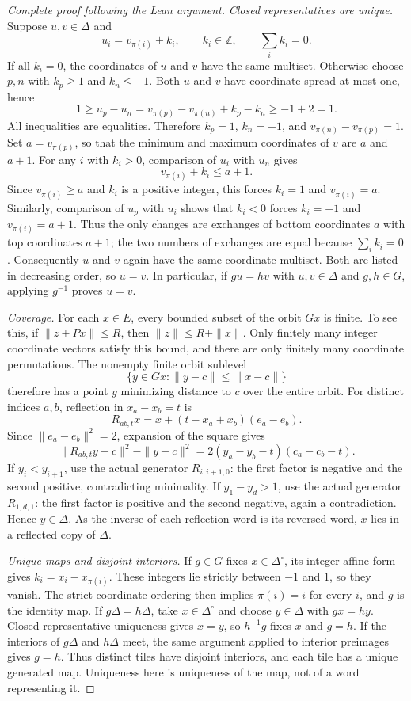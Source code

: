 \begin{proof}[Complete proof following the Lean argument]
\emph{Closed representatives are unique.}
Suppose \(u,v\in\Delta\) and
\[
             u_i=v_{\pi(i)}+k_i,\qquad
             k_i\in\mathbb Z,\qquad \sum_i k_i=0.
\]
If all \(k_i=0\), the coordinates of \(u\) and \(v\) have the same multiset.
Otherwise choose \(p,n\) with \(k_p\ge1\) and \(k_n\le-1\).
Both \(u\) and \(v\) have coordinate spread at most one, hence
\[
  1\ge u_p-u_n
     =v_{\pi(p)}-v_{\pi(n)}+k_p-k_n
     \ge-1+2=1.
\]
All inequalities are equalities. Therefore \(k_p=1\), \(k_n=-1\), and
\(v_{\pi(n)}-v_{\pi(p)}=1\). Set \(a=v_{\pi(p)}\), so that the minimum
and maximum coordinates of \(v\) are \(a\) and \(a+1\).
For any \(i\) with \(k_i>0\), comparison of \(u_i\) with \(u_n\) gives
\[
             v_{\pi(i)}+k_i\le a+1.
\]
Since \(v_{\pi(i)}\ge a\) and \(k_i\) is a positive integer, this forces
\(k_i=1\) and \(v_{\pi(i)}=a\).
Similarly, comparison of \(u_p\) with \(u_i\) shows that \(k_i<0\)
forces \(k_i=-1\) and \(v_{\pi(i)}=a+1\).
Thus the only changes are exchanges of bottom coordinates \(a\) with top
coordinates \(a+1\); the two numbers of exchanges are equal because
\(\sum_i k_i=0\). Consequently \(u\) and \(v\) again have the same
coordinate multiset. Both are listed in decreasing order, so \(u=v\).
In particular, if \(g u=h v\) with \(u,v\in\Delta\) and \(g,h\in G\),
applying \(g^{-1}\) proves \(u=v\).

\emph{Coverage.}
For each \(x\in E\), every bounded subset of the orbit \(Gx\) is finite.
To see this, if \(\|z+P x\|\le R\), then
\(\|z\|\le R+\|x\|\). Only finitely many integer coordinate vectors satisfy
this bound, and there are only finitely many coordinate permutations.
The nonempty finite orbit sublevel
\[
             \{y\in Gx:\|y-c\|\le\|x-c\|\}
\]
therefore has a point \(y\) minimizing distance to \(c\) over the entire
orbit.
For distinct indices \(a,b\), reflection in \(x_a-x_b=t\) is
\[
 R_{ab,t}x=x+(t-x_a+x_b)(e_a-e_b).
\]
Since \(\|e_a-e_b\|^2=2\), expansion of the square gives
\[
 \|R_{ab,t}y-c\|^2-\|y-c\|^2
       =2(y_a-y_b-t)(c_a-c_b-t).
\]
If \(y_i<y_{i+1}\), use the actual generator \(R_{i,i+1,0}\):
the first factor is negative and the second positive, contradicting
minimality. If \(y_1-y_d>1\), use the actual generator \(R_{1,d,1}\):
the first factor is positive and the second negative, again a contradiction.
Hence \(y\in\Delta\). As the inverse of each reflection word is its reversed
word, \(x\) lies in a reflected copy of \(\Delta\).

\emph{Unique maps and disjoint interiors.}
If \(g\in G\) fixes \(x\in\Delta^\circ\), its integer-affine form gives
\(k_i=x_i-x_{\pi(i)}\). These integers lie strictly between \(-1\) and \(1\),
so they vanish. The strict coordinate ordering then implies \(\pi(i)=i\)
for every \(i\), and \(g\) is the identity map.
If \(g\Delta=h\Delta\), take \(x\in\Delta^\circ\) and choose
\(y\in\Delta\) with \(g x=h y\). Closed-representative uniqueness gives
\(x=y\), so \(h^{-1}g\) fixes \(x\) and \(g=h\).
If the interiors of \(g\Delta\) and \(h\Delta\) meet, the same argument
applied to interior preimages gives \(g=h\).
Thus distinct tiles have disjoint interiors, and each tile has a unique
generated map. Uniqueness here is uniqueness of the map, not of a word
representing it.


\end{proof}

